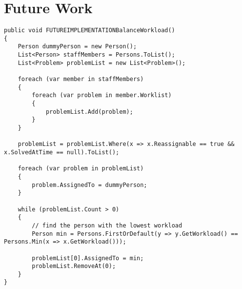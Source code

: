\chapter{Future Work}
\label{chap:future_work}



\begin{lstlisting}[style=sourceCode, caption=\myCaption{A possible future implementation of the BalanceWorkload algorithm.}, label=lst:futureimplementationbalanceWorkload]
public void FUTUREIMPLEMENTATIONBalanceWorkload()
{
    Person dummyPerson = new Person();
    List<Person> staffMembers = Persons.ToList();
    List<Problem> problemList = new List<Problem>();

    foreach (var member in staffMembers)
    {
        foreach (var problem in member.Worklist)
        {
            problemList.Add(problem);
        }
    }

    problemList = problemList.Where(x => x.Reassignable == true && x.SolvedAtTime == null).ToList();

    foreach (var problem in problemList)
    {
        problem.AssignedTo = dummyPerson;
    }

    while (problemList.Count > 0)
    {
        // find the person with the lowest workload
        Person min = Persons.FirstOrDefault(y => y.GetWorkload() == Persons.Min(x => x.GetWorkload()));

        problemList[0].AssignedTo = min;
        problemList.RemoveAt(0);
    }
}
\end{lstlisting}






